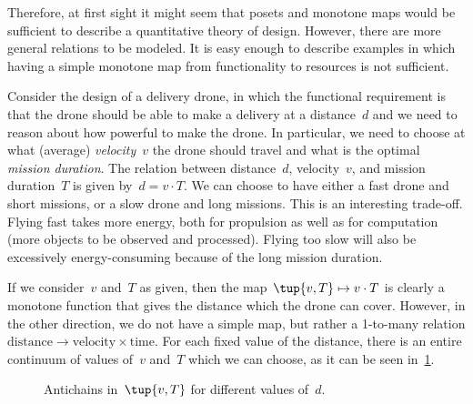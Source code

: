 \begin{comment}
  \begin{figure}[h!]
    \centering
    \begin{tikzcd}
      \bullet &\arrow[l] \bullet\\[-15pt]
      \text{mass} & \text{capacity}
    \end{tikzcd}
    \caption{Example of the design of a battery. }
    \label{fig:battery-example}
  \end{figure}
\end{comment}

Therefore, at first sight it might seem that posets and monotone maps would be sufficient to describe a quantitative theory of design. However, there are more general relations to be modeled. It is easy enough to describe examples in which having a simple monotone map from functionality to resources is not sufficient.

\begin{example}
  Consider the design of a delivery drone, in which the functional requirement is that the drone should be able to make a delivery at a distance~$d$ and we need to reason about how powerful to make the drone. In particular, we need to choose at what (average) \emph{velocity}~$v$ the drone should travel and what is the optimal \emph{mission duration}. The relation between distance~$d$, velocity~$v$, and mission duration~$T$ is given by~$d=v\cdot T$. We can choose to have either a fast drone and short missions, or a slow drone and long missions. This is an interesting trade-off. Flying fast takes more energy, both for propulsion as well as for computation (more objects to be observed and processed). Flying too slow will also be excessively energy-consuming because of the long mission duration.

  If we consider~$v$ and~$T$ as given, then the map~$\tup{v,T} \mapsto v\cdot T$ is clearly a monotone function that gives the distance which the drone can cover. However, in the other direction, we do not have a simple map, but rather a 1-to-many relation $\mathrm{distance}\to \mathrm{velocity}\times \mathrm{time}$. For each fixed value of the distance, there is an entire continuum of values of~$v$ and~$T$ which we can choose, as it can be seen in~\cref{fig:drone-example-antichain}.

  \begin{figure}[h!]
    \centering
    \caption{Antichains in~$\tup{v,T}$ for different values of~$d$.}
    \label{fig:drone-example-antichain}
  \end{figure}

\end{example}

